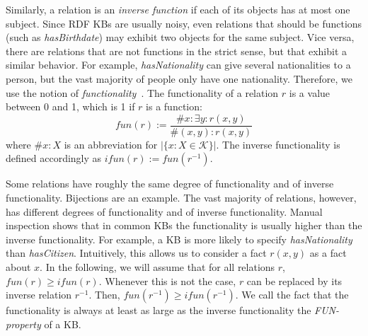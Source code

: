 Similarly, a relation is an \emph{inverse function} if each of its objects has at most one subject. %
Since RDF KBs are usually noisy, even relations that should be functions (such as \emph{has\-Birthdate}) may exhibit two objects for the same subject.
Vice versa, there are relations that are not functions in the strict sense, but that exhibit a similar behavior.
For example, \emph{has\-Nationality} can give several nationalities to a person, but the vast majority of people only have one nationality.
Therefore, we use the notion of \emph{functionality}~\cite{paris}. The functionality of a relation $r$ is a value between 0 and 1, which is 1 if $r$ is a function:
\[fun(r) := \frac{\#x: \exists y: r(x,y)}{\#(x,y): r(x,y)}\]
where  $\#x:X$ is an abbreviation for $|\{x: X \in \mathcal{K}\}|$.
The inverse functionality is defined accordingly as $ifun(r):=fun(r^{-1})$.

Some relations have roughly the same degree of functionality and of inverse functionality. Bijections are an example.
The vast majority of relations, however, has different degrees of functionality and of inverse functionality.
Manual inspection shows that in common KBs the functionality is usually higher than the inverse functionality.
For example, a KB is more likely to specify \emph{has\-Nationality} than \emph{has\-Citizen}.
Intuitively, this allows us to consider a fact $r(x,y)$ as a fact about $x$.
In the following, we will assume that for all relations $r$, $fun(r)\geq ifun(r)$.
Whenever this is not the case, $r$ can be replaced by its inverse relation $r^{-1}$. Then, $fun(r^{-1})\geq ifun(r^{-1})$.
We call the fact that the functionality is always at least as large as the inverse functionality the \emph{FUN-property} of a KB. %



